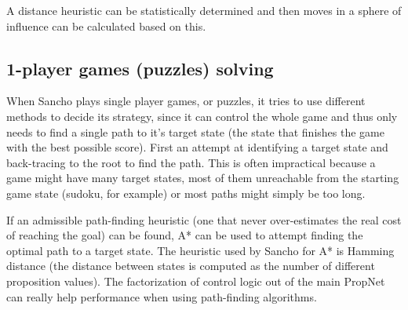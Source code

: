 A distance heuristic can be statistically determined and then moves in a sphere of influence can be calculated based on this. 
\fi


\subsection{1-player games (puzzles) solving}

When Sancho plays single player games, or puzzles, it tries to use different methods to decide its strategy, since it can control the whole game and thus only needs to find a single path to it's target state (the state that finishes the game with the best possible score).
First an attempt at identifying a target state and back-tracing to the root to find the path. This is often impractical because a game might have many target states, most of them unreachable from the starting game state (sudoku, for example) or most paths might simply be too long.

If an admissible path-finding heuristic (one that never over-estimates the real cost of reaching the goal) can be found, A* can be used to attempt finding the optimal path to a target state. The heuristic used by Sancho for A* is Hamming distance (the distance between states is computed as the number of different proposition values).
The factorization of control logic out of the main PropNet can really help performance when using path-finding algorithms.

